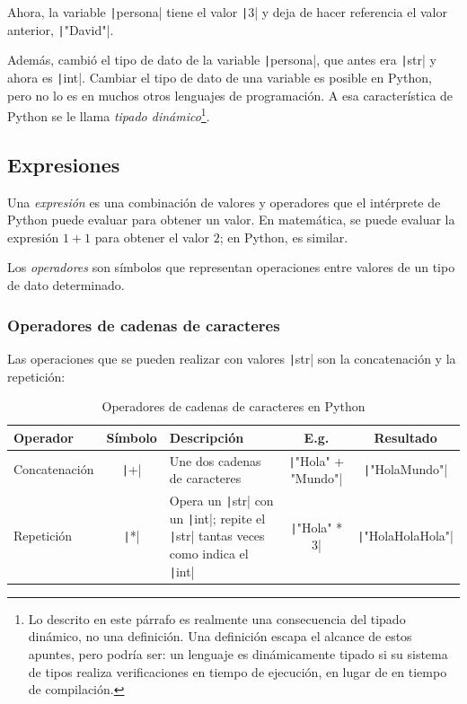 Ahora, la variable \texttt|persona| tiene el valor \texttt|3| y deja de hacer referencia el valor anterior, \texttt|"David"|.

Además, cambió el tipo de dato de la variable \texttt|persona|, que antes era \texttt|str| y ahora es \texttt|int|. Cambiar el tipo de dato de una variable es posible en Python, pero no lo es en muchos otros lenguajes de programación. A esa característica de Python se le llama \emph{tipado dinámico}\footnote{Lo descrito en este párrafo es realmente una consecuencia del tipado dinámico, no una definición. Una definición escapa el alcance de estos apuntes, pero podría ser: un lenguaje es dinámicamente tipado si su sistema de tipos realiza verificaciones en tiempo de ejecución, en lugar de en tiempo de compilación.}.

\subsection{Expresiones}

Una \emph{expresión} es una combinación de valores y operadores que el intérprete de Python puede evaluar para obtener un valor. En matemática, se puede evaluar la expresión $1 + 1$ para obtener el valor $2$; en Python, es similar.

Los \emph{operadores} son símbolos que representan operaciones entre valores de un tipo de dato determinado. 

\subsubsection{Operadores de cadenas de caracteres}

Las operaciones que se pueden realizar con valores \texttt|str| son la concatenación y la repetición:

\begin{table}[h]
\centering
\begin{tabular}{|l|c|p{5cm}|c|c|}
\hline
\textbf{Operador} & \textbf{Símbolo} & \textbf{Descripción} & \textbf{E.g.} & \textbf{Resultado} \\
\hline
Concatenación & \texttt|+| & Une dos cadenas de caracteres & \texttt|"Hola" + "Mundo"| & \texttt|"HolaMundo"| \\
\hline
Repetición & \texttt|*| & Opera un \texttt|str| con un \texttt|int|; repite el \texttt|str| tantas veces como indica el \texttt|int| & \texttt|"Hola" * 3| & \texttt|"HolaHolaHola"| \\
\hline
\end{tabular}
\caption{Operadores de cadenas de caracteres en Python}
\label{tab:operadores-strings}
\end{table}

